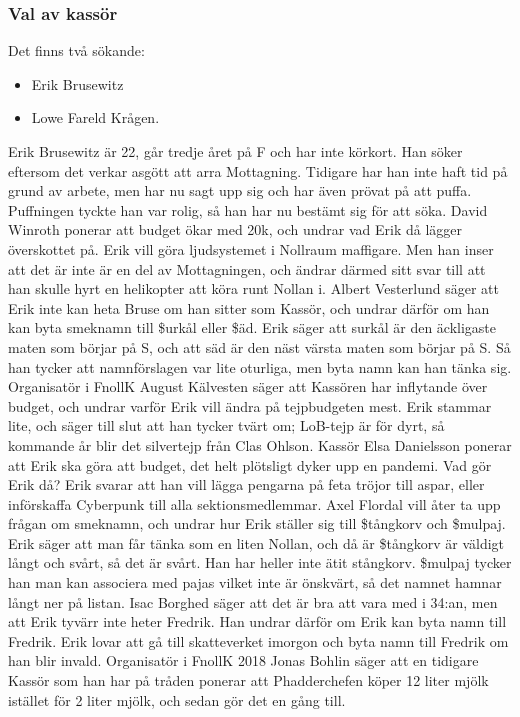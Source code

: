 \documentclass[hidelinks]{sektionsmote} %
\begin{document}
\subsubsection{Val av kassör}
Det finns två sökande:
\begin{itemize}
    \item Erik Brusewitz
    \item Lowe Fareld Krågen.
\end{itemize}

Erik Brusewitz är 22, går tredje året på F och har inte körkort.
Han söker eftersom det verkar asgött att arra Mottagning.
Tidigare har han inte haft tid på grund av arbete, men har nu sagt upp sig och har även prövat på att puffa.
Puffningen tyckte han var rolig, så han har nu bestämt sig för att söka.
David Winroth ponerar att budget ökar med 20k, och undrar vad Erik då lägger överskottet på.
Erik vill göra ljudsystemet i Nollraum maffigare.
Men han inser att det är inte är en del av Mottagningen, och ändrar därmed sitt svar till att han skulle hyrt en helikopter att köra runt Nollan i.
Albert Vesterlund säger att Erik inte kan heta Bruse om han sitter som Kassör, och undrar därför om han kan byta smeknamn till \$urkål eller \$äd.
Erik säger att surkål är den äckligaste maten som börjar på S, och att säd är den näst värsta maten som börjar på S.
Så han tycker att namnförslagen var lite oturliga, men byta namn kan han tänka sig.
Organisatör i FnollK August Kälvesten säger att Kassören har inflytande över budget, och undrar varför Erik vill ändra på tejpbudgeten mest.
Erik stammar lite, och säger till slut att han tycker tvärt om;
LoB-tejp är för dyrt, så kommande år blir det silvertejp från Clas Ohlson.
Kassör Elsa Danielsson ponerar att Erik ska göra att budget, det helt plötsligt dyker upp en pandemi.
Vad gör Erik då?
Erik svarar att han vill lägga pengarna på feta tröjor till aspar, eller införskaffa Cyberpunk till alla sektionsmedlemmar.
Axel Flordal vill åter ta upp frågan om smeknamn, och undrar hur Erik ställer sig till \$tångkorv och \$mulpaj.
Erik säger att man får tänka som en liten Nollan, och då är \$tångkorv är väldigt långt och svårt, så det är svårt.
Han har heller inte ätit stångkorv.
\$mulpaj tycker han man kan associera med pajas vilket inte är önskvärt, så det namnet hamnar långt ner på listan.
Isac Borghed säger att det är bra att vara med i 34:an, men att Erik tyvärr inte heter Fredrik.
Han undrar därför om Erik kan byta namn till Fredrik.
Erik lovar att gå till skatteverket imorgon och byta namn till Fredrik om han blir invald.
Organisatör i FnollK 2018 Jonas Bohlin säger att en tidigare Kassör som han har på tråden ponerar att Phadderchefen köper 12 liter mjölk istället för 2 liter mjölk, och sedan gör det en gång till.
\end{document}
